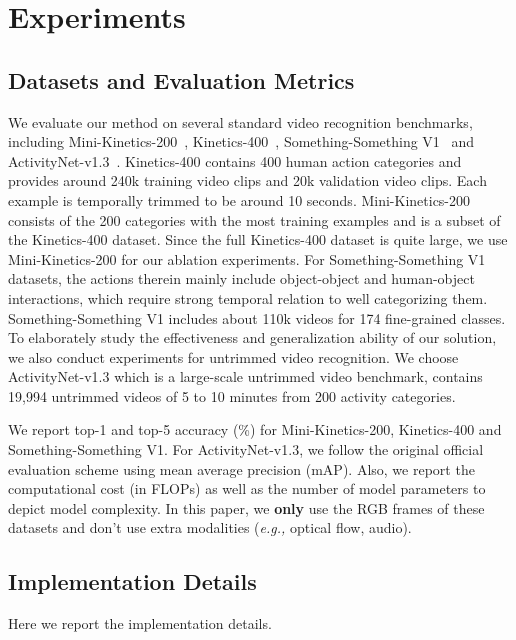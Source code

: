 \documentclass[sigconf]{acmart}
\begin{document}
 


\section{Experiments}
\subsection{Datasets and Evaluation Metrics}
We evaluate our method on several standard video recognition benchmarks, including Mini-Kinetics-200~\cite{s3d}, Kinetics-400~\cite{kay2017kinetics}, Something-Something V1~\cite{sth-sth} and ActivityNet-v1.3~\cite{caba2015activitynet}. 
Kinetics-400 contains 400 human action categories and provides around 240k training video clips and 20k validation video clips. Each example is temporally trimmed to be around 10 seconds.
Mini-Kinetics-200 consists of the 200 categories with the most training examples and is a subset of the Kinetics-400 dataset. Since the full Kinetics-400 dataset is quite large, we use Mini-Kinetics-200 for our ablation experiments.
For Something-Something V1 datasets, the actions therein mainly include object-object and human-object interactions, which require strong temporal relation to well categorizing them. Something-Something V1 includes about 110k videos for 174 fine-grained classes.
To elaborately study the effectiveness and generalization ability of our solution, we also conduct experiments for untrimmed video recognition. We choose ActivityNet-v1.3 which is a large-scale untrimmed video benchmark, contains 19,994 untrimmed videos of 5 to 10 minutes from 200 activity categories.


We report top-1 and top-5 accuracy (\%) for Mini-Kinetics-200, Kinetics-400 and Something-Something V1. For ActivityNet-v1.3, we follow the original official evaluation scheme using mean average precision (mAP).
Also, we report the computational cost (in FLOPs) as well as the number of model parameters to depict model complexity. In this paper, we \textbf{only} use the RGB frames of these datasets and don't use extra modalities (\emph{e.g.,} optical flow, audio).



\subsection{Implementation Details}
Here we report the implementation details.
\end{document}
